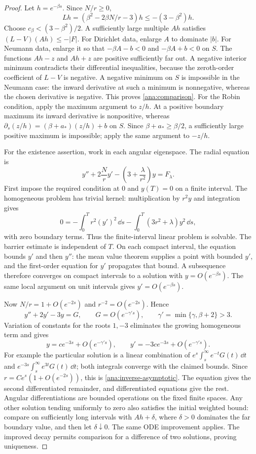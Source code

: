 \begin{proof}
Let $h=e^{-\beta s}$.  Since $N/r\geq0$,
\[
  Lh=(\beta^2-2\beta N/r-3)h
       \leq-(3-\beta^2)h.
\]
Choose $c_\beta<(3-\beta^2)/2$.  A sufficiently large multiple
$Ah$ satisfies $(L-V)(Ah)\leq-|F|$.  For Dirichlet data, enlarge
$A$ to dominate $|b|$.  For Neumann data, enlarge it so that
$-\beta A-b<0$ and $-\beta A+b<0$ on $S$.
The functions $Ah-z$ and $Ah+z$ are positive sufficiently far out.
A negative interior minimum contradicts their differential inequalities,
because the zeroth-order coefficient of $L-V$ is negative.
A negative minimum on $S$ is impossible in the Neumann case: the
inward derivative at such a minimum is nonnegative, whereas the
chosen derivative is negative.  This proves \eqref{ana:comparison}.
For the Robin condition, apply the maximum argument to $z/h$.
At a positive boundary maximum its inward derivative is nonpositive,
whereas
$\partial_s(z/h)=(\beta+a_*)(z/h)+b$ on $S$.
Since $\beta+a_*\geq\beta/2$, a sufficiently large positive maximum
is impossible; apply the same argument to $-z/h$.

For the existence assertion, work in each angular eigenspace.  The
radial equation is
\begin{equation}
 y''+2\frac Nr y'-\left(3+\frac\lambda{r^2}\right)y=F_\lambda.
 \label{ana:radial-ode}
\end{equation}
First impose the required condition at $0$ and $y(T)=0$ on a finite
interval.  The homogeneous problem has trivial kernel: multiplication
by $r^2y$ and integration gives
\[
  0=-\int_0^T r^2(y')^2\,\dd s
    -\int_0^T(3r^2+\lambda)y^2\,\dd s,
\]
with zero boundary terms.  Thus the finite-interval linear problem is
solvable.  The barrier estimate is independent of $T$.  On each compact
interval, the equation bounds $y'$ and then $y''$: the mean value
theorem supplies a point with bounded $y'$, and the first-order equation
for $y'$ propagates that bound.  A subsequence therefore converges on
compact intervals to a solution with $y=O(e^{-\beta s})$.
The same local argument on unit intervals gives
$y'=O(e^{-\beta s})$.

Now $N/r=1+O(e^{-2s})$ and $r^{-2}=O(e^{-2s})$.  Hence
\[
  y''+2y'-3y=G,\qquad
  G=O(e^{-\gamma' s}),\qquad
  \gamma'=\min\{\gamma,\beta+2\}>3.
\]
Variation of constants for the roots $1,-3$ eliminates the growing
homogeneous term and gives
\[
 y=c e^{-3s}+O(e^{-\gamma' s}),\qquad
 y'=-3c e^{-3s}+O(e^{-\gamma' s}).
\]
For example the particular solution is a linear combination of
$e^s\int_s^\infty e^{-t}G(t)\,\dd t$ and
$e^{-3s}\int_s^\infty e^{3t}G(t)\,\dd t$; both integrals converge
with the claimed bounds.  Since
$r=C e^s(1+O(e^{-2s}))$, this is
\eqref{ana:inverse-asymptotic}.  The equation gives the second
differentiated remainder, and differentiated equations give the rest.
Angular differentiations are bounded operations on the fixed finite
spaces.  Any other solution tending uniformly to zero also satisfies
the initial weighted bound: compare on sufficiently long intervals
with $Ah+\delta$, where $\delta>0$ dominates the far boundary value,
and then let $\delta\downarrow0$.  The same ODE improvement applies.
The improved decay permits comparison for a difference of two
solutions, proving uniqueness.
\end{proof}

